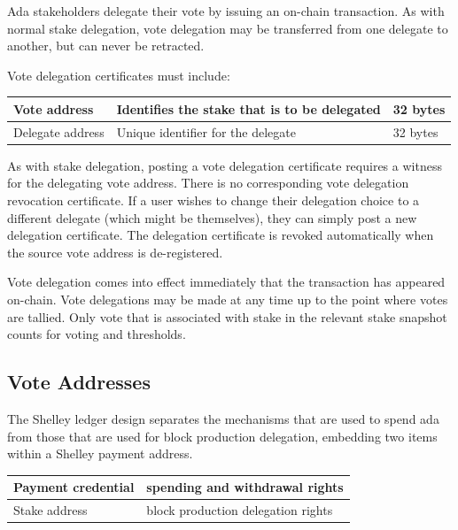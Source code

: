 Ada stakeholders delegate their vote by issuing an on-chain transaction.  As with normal stake delegation, vote delegation may be transferred from one delegate to another, but can never be retracted.

Vote delegation certificates must include:

\begin{tabular}{||l|p{3in}|l||}
  \hline\hline
  Vote address & Identifies the stake that is to be delegated  & 32 bytes
  \\\hline
  Delegate address & Unique identifier for the delegate & 32 bytes
  \\\hline
  \hline
\end{tabular}
As with stake delegation, posting a vote delegation certificate requires a witness for the delegating vote address.
There is no corresponding vote delegation revocation certificate. If a user wishes to change their delegation choice to a different delegate (which might be themselves),
they can simply post a new delegation certificate. The delegation certificate is revoked automatically when the source vote address is de-registered.

Vote delegation comes into effect immediately that the transaction has appeared on-chain.  %
Vote delegations may be made at any time up to the point where votes are tallied.
Only vote that is associated with stake in the relevant stake snapshot counts for voting and thresholds.

\subsection{Vote Addresses}

The Shelley ledger design separates the mechanisms that are used to spend ada from those that are used for block production delegation, embedding two items within a Shelley payment address.

\begin{center}
  \begin{tabular}{||l|l||}
  \hline\hline
  Payment credential & spending and withdrawal rights \\\hline
  Stake address & block production delegation rights \\\hline
  \hline
  \end{tabular}
\end{center}

